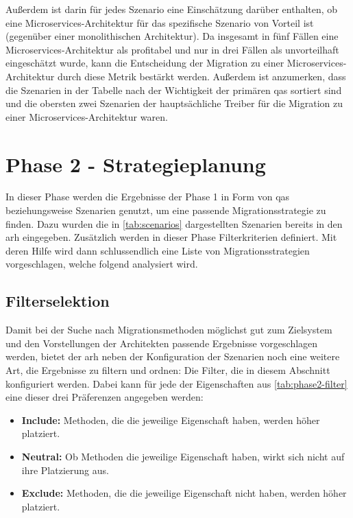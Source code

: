 

Außerdem ist darin für jedes Szenario eine Einschätzung darüber enthalten, ob eine Microservices-Architektur für das spezifische Szenario von Vorteil ist (gegenüber einer monolithischen Architektur).
Da insgesamt in fünf Fällen eine Microservices-Architektur als profitabel und nur in drei Fällen als unvorteilhaft eingeschätzt wurde, kann die Entscheidung der Migration zu einer Microservices-Architektur durch diese Metrik bestärkt werden.
Außerdem ist anzumerken, dass die Szenarien in der Tabelle nach der Wichtigkeit der primären \glspl{qa} sortiert sind und die obersten zwei Szenarien der hauptsächliche Treiber für die Migration zu einer Microservices-Architektur waren.

\section{Phase 2 - Strategieplanung}
\label{sec:durchführung-phase2}

In dieser Phase werden die Ergebnisse der Phase 1 in Form von \glspl{qa} beziehungsweise Szenarien genutzt, um eine passende Migrationsstrategie zu finden.
Dazu wurden die in \cref{tab:scenarios} dargestellten Szenarien bereits in den \gls{arh} eingegeben.
Zusätzlich werden in dieser Phase Filterkriterien definiert.
Mit deren Hilfe wird dann schlussendlich eine Liste von Migrationsstrategien vorgeschlagen, welche folgend analysiert wird.

\subsection{Filterselektion}
Damit bei der Suche nach Migrationsmethoden möglichst gut zum Zielsystem und den Vorstellungen der Architekten passende Ergebnisse vorgeschlagen werden, bietet der \gls{arh} neben der Konfiguration der Szenarien noch eine weitere Art, die Ergebnisse zu filtern und ordnen: Die Filter, die in diesem Abschnitt konfiguriert werden.
Dabei kann für jede der Eigenschaften aus \cref{tab:phase2-filter} eine dieser drei Präferenzen angegeben werden:
\begin{itemize}
	\item \textbf{Include:} Methoden, die die jeweilige Eigenschaft haben, werden höher platziert.
	\item \textbf{Neutral:} Ob Methoden die jeweilige Eigenschaft haben, wirkt sich nicht auf ihre Platzierung aus.
	\item \textbf{Exclude:} Methoden, die die jeweilige Eigenschaft nicht haben, werden höher platziert.
\end{itemize}

